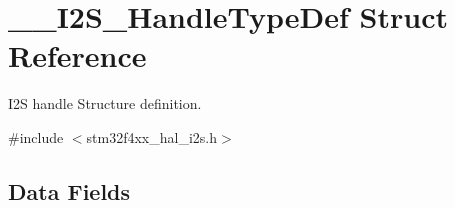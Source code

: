 \hypertarget{struct_____i2_s___handle_type_def}{}\section{\+\_\+\+\_\+\+I2\+S\+\_\+\+Handle\+Type\+Def Struct Reference}
\label{struct_____i2_s___handle_type_def}


I2S handle Structure definition.  




{\ttfamily \#include $<$stm32f4xx\+\_\+hal\+\_\+i2s.\+h$>$}

\subsection*{Data Fields}
